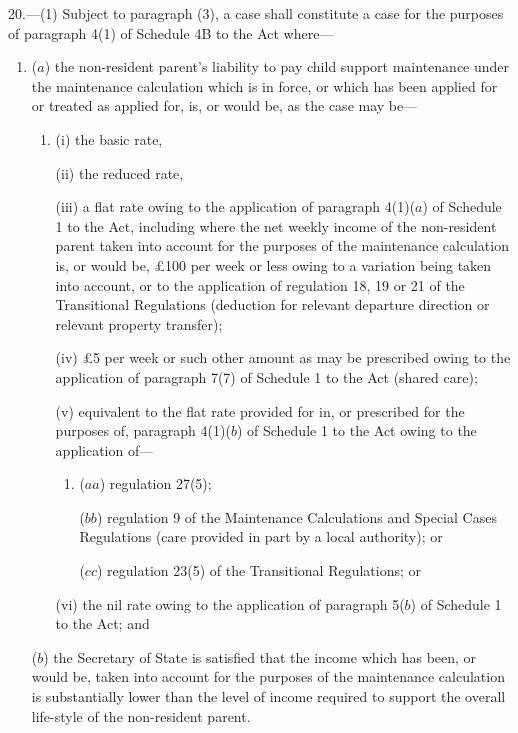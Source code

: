 \documentclass[12pt,a4paper]{article}
\begin{document}
20.---(1)  Subject to paragraph (3), a case shall constitute a case for the purposes of paragraph 4(1) of Schedule 4B to the Act where—
\begin{enumerate}\item[]
($a$) the non-resident parent’s liability to pay child support maintenance under the maintenance calculation which is in force, or which has been applied for or treated as applied for, is, or would be, as the case may be—
\begin{enumerate}\item[]
(i) the basic rate,

(ii) the reduced rate,

(iii) a flat rate owing to the application of paragraph 4(1)($a$)  of Schedule 1 to the Act, including where the net weekly income of the non-resident parent taken into account for the purposes of the maintenance calculation is, or would be, £100 per week or less owing to a variation being taken into account, or to the application of regulation 18, 19 or 21 of the Transitional Regulations (deduction for relevant departure direction or relevant property transfer);

(iv) £5 per week or such other amount as may be prescribed owing to the application of paragraph 7(7) of Schedule 1 to the Act (shared care);

(v) equivalent to the flat rate provided for in, or prescribed for the purposes of, paragraph 4(1)($b$)  of Schedule 1 to the Act owing to the application of—
\begin{enumerate}\item[]
($aa$) regulation 27(5);

($bb$) regulation 9 of the Maintenance Calculations and Special Cases Regulations (care provided in part by a local authority); or

($cc$) regulation 23(5) of the Transitional Regulations; or
\end{enumerate}

(vi) the nil rate owing to the application of paragraph 5($b$)  of Schedule 1 to the Act; and
\end{enumerate}

($b$) the Secretary of State is satisfied that the income which has been, or would be, taken into account for the purposes of the maintenance calculation is substantially lower than the level of income required to support the overall life-style of the non-resident parent.
\end{enumerate}
\end{document}
